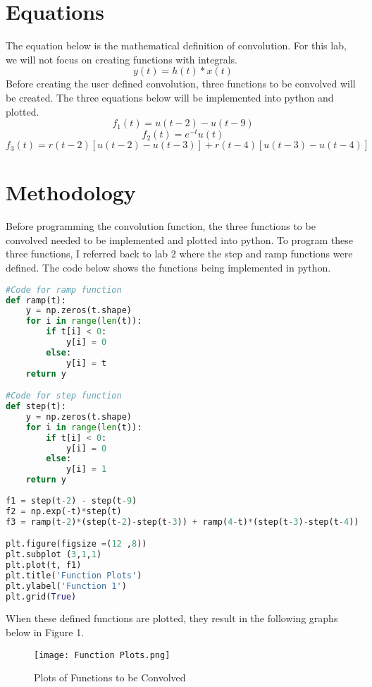 \documentclass[12pt]{report}
\begin{document}
\section{Equations}
\hspace{\parindent}The equation below is the mathematical definition of convolution. For this lab, we will not focus on creating functions with integrals.
\[y(t) = h(t) * x(t)\]
\hspace{\parindent}Before creating the user defined convolution, three functions to be convolved will be created. The three equations below will be implemented into python and plotted.
\[f_1(t) = u(t - 2) - u(t - 9)\]
\[f_2(t) = e^{-t}u(t)\]
\[f_3(t) = r(t - 2)[u(t - 2) - u(t - 3)] + r(t - 4)[u(t - 3) - u(t - 4)]\]

\section{Methodology}
\hspace{\parindent}Before programming the convolution function, the three functions to be convolved needed to be implemented and plotted into python. To program these three functions, I referred back to lab 2 where the step and ramp functions were defined. The code below shows the functions being implemented in python.
\begin{lstlisting}[language=Python, caption=Functions To Be Convolved]
#Code for ramp function
def ramp(t):
    y = np.zeros(t.shape)
    for i in range(len(t)):
        if t[i] < 0:
            y[i] = 0
        else:
            y[i] = t
    return y

#Code for step function
def step(t):
    y = np.zeros(t.shape)
    for i in range(len(t)):
        if t[i] < 0:
            y[i] = 0
        else:
            y[i] = 1
    return y
    
f1 = step(t-2) - step(t-9)
f2 = np.exp(-t)*step(t)
f3 = ramp(t-2)*(step(t-2)-step(t-3)) + ramp(4-t)*(step(t-3)-step(t-4))

plt.figure(figsize =(12 ,8))
plt.subplot (3,1,1)
plt.plot(t, f1)
plt.title('Function Plots')
plt.ylabel('Function 1')
plt.grid(True)
\end{lstlisting}
\hspace{\parindent}When these defined functions are plotted, they result in the following graphs below in Figure 1. 
\begin{figure}[h!]
    \centering
    \texttt{[image: Function Plots.png]}
    \caption{Plots of Functions to be Convolved}
    \label{Figure 1:}
\end{figure}
\end{document}
